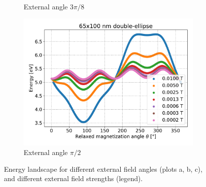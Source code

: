 \documentclass[10pt,a4paper]{article}
\begin{document}
\begin{figure}
\begin{subfigure}[b]{0.65\textwidth}
         \caption{External angle $3\pi/8$}
         \label{fig:barrierLandscape-externalAngle-3pi8}
     \end{subfigure}
     \begin{subfigure}[b]{0.65\textwidth}
         \centering
         \includegraphics[width=\textwidth]{Figures/biaxial_island/BarrierLandscape/Ext_K0.1Ms2_Bext1e-2-1e-4_aPi2.pdf}
         \caption{External angle $\pi/2$}
         \label{fig:barrierLandscape-externalAngle-pi2}
     \end{subfigure}
     \hfill
    \caption{Energy landscape for different external field angles (plots a, b, c), and different external field strengths (legend).}
    \label{fig:barrierLandscape-externalAngle}
\end{figure}


\newpage


\end{document}
